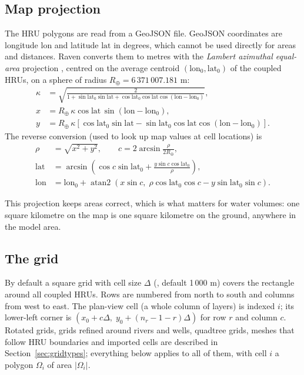 \subsection{Map projection}
The HRU polygons are read from a GeoJSON file. GeoJSON coordinates are longitude $\mathrm{lon}$ and latitude $\mathrm{lat}$ in
degrees, which cannot be used directly for areas and distances. Raven converts them to metres with the
\emph{Lambert azimuthal equal-area} projection \cite{snyder1987map}, centred on the average centroid
$(\mathrm{lon}_0,\mathrm{lat}_0)$ of the coupled HRUs, on a sphere of radius $R_\oplus=6\,371\,007.181$ m:
\begin{align}
\kappa &= \sqrt{\frac{2}{1+\sin\mathrm{lat}_0\sin\mathrm{lat}+\cos\mathrm{lat}_0\cos\mathrm{lat}\cos(\mathrm{lon}-\mathrm{lon}_0)}},\\
x &= R_\oplus\,\kappa\cos\mathrm{lat}\,\sin(\mathrm{lon}-\mathrm{lon}_0),\\
y &= R_\oplus\,\kappa\left[\cos\mathrm{lat}_0\sin\mathrm{lat}-\sin\mathrm{lat}_0\cos\mathrm{lat}\cos(\mathrm{lon}-\mathrm{lon}_0)\right].
\end{align}
The reverse conversion (used to look up map values at cell locations) is
\begin{align}
\rho&=\sqrt{x^2+y^2},\qquad c=2\arcsin\frac{\rho}{2R_\oplus},\\
\mathrm{lat}&=\arcsin\!\left(\cos c\sin\mathrm{lat}_0+\frac{y\sin c\cos\mathrm{lat}_0}{\rho}\right),\\
\mathrm{lon}&=\mathrm{lon}_0+\operatorname{atan2}\!\left(x\sin c,\;\rho\cos\mathrm{lat}_0\cos c-y\sin\mathrm{lat}_0\sin c\right).
\end{align}
\begin{plain}
This projection keeps areas correct, which is what matters for water volumes: one square kilometre on the map is one
square kilometre on the ground, anywhere in the model area.
\end{plain}

\subsection{The grid}
By default a square grid with cell size $\Delta$ (, default 1\,000 m) covers the rectangle around all
coupled HRUs. Rows are numbered from north to south and columns from west to east. The plan-view cell (a whole column of
layers) is indexed $i$; its lower-left corner is $(x_0+c\Delta,\;y_0+(n_r-1-r)\Delta)$ for row $r$ and column $c$. Rotated
grids, grids refined around rivers and wells, quadtree grids, meshes that follow HRU boundaries and imported cells are
described in Section~\ref{sec:gridtypes}; everything below applies to all of them, with cell $i$ a polygon $\Omega_i$ of area $|\Omega_i|$.

